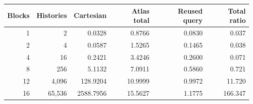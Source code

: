 \begin{tabular}{@{}rrrrrr@{}}
\toprule
Blocks & Histories & Cartesian & Atlas total & Reused query & Total ratio\\
\midrule
1 & 2 & 0.0328 & 0.8766 & 0.0830 & 0.037\\
2 & 4 & 0.0587 & 1.5265 & 0.1465 & 0.038\\
4 & 16 & 0.2421 & 3.4246 & 0.2600 & 0.071\\
8 & 256 & 5.1132 & 7.0911 & 0.5860 & 0.721\\
12 & 4,096 & 128.9204 & 10.9999 & 0.9972 & 11.720\\
16 & 65,536 & 2588.7956 & 15.5627 & 1.1775 & 166.347\\
\bottomrule
\end{tabular}
